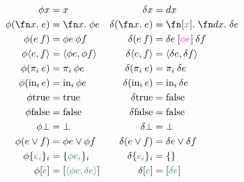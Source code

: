\documentclass{rntz}\usepackage{fantasy}\geometry{textwidth=330pt,}
\begin{document}
\begin{figure*}
  \begin{align*}
    \phi x &= x & \delta x &= \dx\\
    \phi(\fnof x e) &= \fnof x \phi e
    & \delta(\fnof{x} e) &= \fnof{\eboxd x} \fnof\dx \delta e\\
    \phi(e\<f) &= \phi e\<\phi f
    & \delta(e\<f) &= \delta e \<\eboxd{\color{Rhodamine}\phi e} \<\delta f\\
    \phi\etuple{e,f} &= \etuple{\phi e, \phi f}
    & \delta\etuple{e,f} &= \etuple{\delta e, \delta f}\\
    \phi(\pi_i\<e) &= \pi_i\<\phi e
    & \delta(\pi_i\<e) &= \pi_i\<\delta e\\
    \phi(\inj i e) &= \inj i \phi e
    & \delta(\inj i e) &= \inj i \delta e\\
    \phi\etrue &= \etrue & \delta\etrue &= \efalse\\
    \phi\efalse &= \efalse & \delta\efalse &= \efalse\\
    \phi\bot &= \bot & \delta\bot &= \bot\\
    \phi(e \vee f) &= \phi e \vee \phi f
    & \delta(e \vee f) &= \delta e \vee \delta f\\
    \phi\esetd{e_i}_i &= \esetd{\phi e_i}_i & \delta\esetd{e_i}_i &= \esetd{}\\
    \phi\eboxd{e} &= \eboxd{\etuple{\phi e, \delta e}}
    & \delta\eboxd{e} &= \eboxd{\delta e}
  \end{align*}




\end{figure*}
\end{document}
